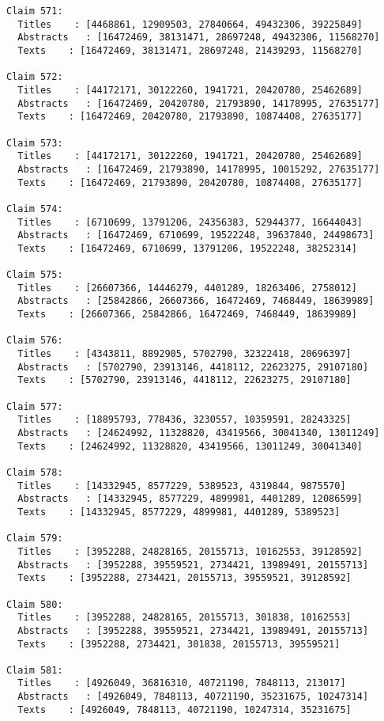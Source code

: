\documentclass[11pt]{article}
\begin{document}
\begin{Verbatim}[commandchars=\\\{\}]
Claim 571:
  Titles    : [4468861, 12909503, 27840664, 49432306, 39225849]
  Abstracts   : [16472469, 38131471, 28697248, 49432306, 11568270]
  Texts    : [16472469, 38131471, 28697248, 21439293, 11568270]

Claim 572:
  Titles    : [44172171, 30122260, 1941721, 20420780, 25462689]
  Abstracts   : [16472469, 20420780, 21793890, 14178995, 27635177]
  Texts    : [16472469, 20420780, 21793890, 10874408, 27635177]

Claim 573:
  Titles    : [44172171, 30122260, 1941721, 20420780, 25462689]
  Abstracts   : [16472469, 21793890, 14178995, 10015292, 27635177]
  Texts    : [16472469, 21793890, 20420780, 10874408, 27635177]

Claim 574:
  Titles    : [6710699, 13791206, 24356383, 52944377, 16644043]
  Abstracts   : [16472469, 6710699, 19522248, 39637840, 24498673]
  Texts    : [16472469, 6710699, 13791206, 19522248, 38252314]

Claim 575:
  Titles    : [26607366, 14446279, 4401289, 18263406, 2758012]
  Abstracts   : [25842866, 26607366, 16472469, 7468449, 18639989]
  Texts    : [26607366, 25842866, 16472469, 7468449, 18639989]

Claim 576:
  Titles    : [4343811, 8892905, 5702790, 32322418, 20696397]
  Abstracts   : [5702790, 23913146, 4418112, 22623275, 29107180]
  Texts    : [5702790, 23913146, 4418112, 22623275, 29107180]

Claim 577:
  Titles    : [18895793, 778436, 3230557, 10359591, 28243325]
  Abstracts   : [24624992, 11328820, 43419566, 30041340, 13011249]
  Texts    : [24624992, 11328820, 43419566, 13011249, 30041340]

Claim 578:
  Titles    : [14332945, 8577229, 5389523, 4319844, 9875570]
  Abstracts   : [14332945, 8577229, 4899981, 4401289, 12086599]
  Texts    : [14332945, 8577229, 4899981, 4401289, 5389523]

Claim 579:
  Titles    : [3952288, 24828165, 20155713, 10162553, 39128592]
  Abstracts   : [3952288, 39559521, 2734421, 13989491, 20155713]
  Texts    : [3952288, 2734421, 20155713, 39559521, 39128592]

Claim 580:
  Titles    : [3952288, 24828165, 20155713, 301838, 10162553]
  Abstracts   : [3952288, 39559521, 2734421, 13989491, 20155713]
  Texts    : [3952288, 2734421, 301838, 20155713, 39559521]

Claim 581:
  Titles    : [4926049, 36816310, 40721190, 7848113, 213017]
  Abstracts   : [4926049, 7848113, 40721190, 35231675, 10247314]
  Texts    : [4926049, 7848113, 40721190, 10247314, 35231675]


\end{Verbatim}
\end{document}
